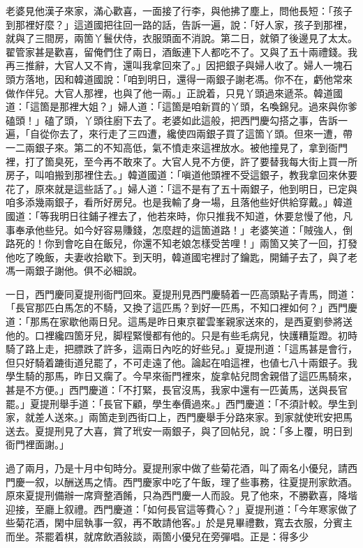 老婆見他漢子來家，滿心歡喜，一面接了行李，與他拂了塵上，問他長短：「孩子到那裡好麼？」這道國把往回一路的話，告訴一遍，說：「好人家，孩子到那裡，就與了三間房，兩箇丫鬟伏侍，衣服頭面不消說。第二日，就領了後邊見了太太。翟管家甚是歡喜，留俺們住了兩日，酒飯連下人都吃不了。又與了五十兩禮錢。我再三推辭，大官人又不肯，還叫我拿回來了。」因把銀子與婦人收了。婦人一塊石頭方落地，因和韓道國說：「咱到明日，還得一兩銀子謝老馮。你不在，虧他常來做作伴兒。大官人那裡，也與了他一兩。」正說着，只見丫頭過來遞茶。韓道國道：「這箇是那裡大姐？」婦人道：「這箇是咱新買的丫頭，名喚錦兒。過來與你爹磕頭！」磕了頭，丫頭往廚下去了。老婆如此這般，把西門慶勾搭之事，告訴一遍，「自從你去了，來行走了三四遭，纔使四兩銀子買了這箇丫頭。但來一遭，帶一二兩銀子來。第二的不知高低，氣不憤走來這裡放水。被他撞見了，拿到衙門裡，打了箇臭死，至今再不敢來了。大官人見不方便，許了要替我每大街上買一所房子，叫咱搬到那裡住去。」韓道國道：「嗔道他頭裡不受這銀子，教我拿回來休要花了，原來就是這些話了。」婦人道：「這不是有了五十兩銀子，他到明日，已定與咱多添幾兩銀子，看所好房兒。也是我輸了身一場，且落他些好供給穿戴。」韓道國道：「等我明日往鋪子裡去了，他若來時，你只推我不知道，休要怠慢了他，凡事奉承他些兒。如今好容易賺錢，怎麼趕的這箇道路！」{}老婆笑道：「賊強人，倒路死的！你到會吃自在飯兒，你還不知老娘怎樣受苦哩！」兩箇又笑了一回，打發他吃了晚飯，夫妻收拾歇下。到天明，韓道國宅裡討了鑰匙，開鋪子去了，與了老馮一兩銀子謝他。俱不必細說。

一日，西門慶同夏提刑衙門回來。夏提刑見西門慶騎着一匹高頭點子青馬，問道：「長官那匹白馬怎的不騎，又換了這匹馬？到好一匹馬，不知口裡如何？」西門慶道：「那馬在家歇他兩日兒。這馬是昨日東京翟雲峯親家送來的，{}是西夏劉參將送他的。口裡纔四箇牙兒，脚程緊慢都有他的。只是有些毛病兒，快護糟踅蹬。初時騎了路上走，把膘跌了許多，這兩日內吃的好些兒。」夏提刑道：「這馬甚是會行，但只好騎着蹗街道兒罷了，不可走遠了他。論起在咱這裡，也値七八十兩銀子。我學生騎的那馬，昨日又瘸了。今早來衙門裡來，旋拿帖兒問舍親借了這匹馬騎來，甚是不方便。」西門慶道：「不打緊，長官沒馬，我家中還有一匹黃馬，送與長官罷。」夏提刑舉手道：「長官下顧，學生奉價過來。」西門慶道：「不須計較。學生到家，就差人送來。」兩箇走到西街口上，西門慶舉手分路來家。到家就使玳安把馬送去。夏提刑見了大喜，賞了玳安一兩銀子，與了回帖兒，說：「多上覆，明日到衙門裡面謝。」

過了兩月，乃是十月中旬時分。夏提刑家中做了些菊花酒，叫了兩名小優兒，請西門慶一叙，以酬送馬之情。西門慶家中吃了午飯，理了些事務，往夏提刑家飲酒。原來夏提刑備辦一席齊整酒餚，只為西門慶一人而設。見了他來，不勝歡喜，降堦迎接，至廳上叙禮。西門慶道：「如何長官這等費心？」夏提刑道：「今年寒家做了些菊花酒，閑中屈執事一叙，再不敢請他客。」於是見畢禮數，寬去衣服，分賓主而坐。茶罷着棋，就席飲酒敍談，兩箇小優兒在旁彈唱。正是：得多少

